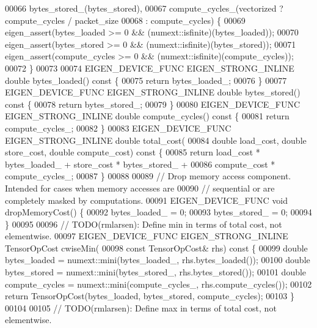 \begin{DoxyCode}
00066         bytes\_stored\_(bytes\_stored),
00067         compute\_cycles\_(vectorized ? compute\_cycles / packet\_size
00068                                    : compute\_cycles) \{
00069     eigen\_assert(bytes\_loaded >= 0 && (numext::isfinite)(bytes\_loaded));
00070     eigen\_assert(bytes\_stored >= 0 && (numext::isfinite)(bytes\_stored));
00071     eigen\_assert(compute\_cycles >= 0 && (numext::isfinite)(compute\_cycles));
00072   \}
00073 
00074   EIGEN\_DEVICE\_FUNC EIGEN\_STRONG\_INLINE \textcolor{keywordtype}{double} bytes\_loaded()\textcolor{keyword}{ const }\{
00075     \textcolor{keywordflow}{return} bytes\_loaded\_;
00076   \}
00077   EIGEN\_DEVICE\_FUNC EIGEN\_STRONG\_INLINE \textcolor{keywordtype}{double} bytes\_stored()\textcolor{keyword}{ const }\{
00078     \textcolor{keywordflow}{return} bytes\_stored\_;
00079   \}
00080   EIGEN\_DEVICE\_FUNC EIGEN\_STRONG\_INLINE \textcolor{keywordtype}{double} compute\_cycles()\textcolor{keyword}{ const }\{
00081     \textcolor{keywordflow}{return} compute\_cycles\_;
00082   \}
00083   EIGEN\_DEVICE\_FUNC EIGEN\_STRONG\_INLINE \textcolor{keywordtype}{double} total\_cost(
00084       \textcolor{keywordtype}{double} load\_cost, \textcolor{keywordtype}{double} store\_cost, \textcolor{keywordtype}{double} compute\_cost)\textcolor{keyword}{ const }\{
00085     \textcolor{keywordflow}{return} load\_cost * bytes\_loaded\_ + store\_cost * bytes\_stored\_ +
00086            compute\_cost * compute\_cycles\_;
00087   \}
00088 
00089   \textcolor{comment}{// Drop memory access component. Intended for cases when memory accesses are}
00090   \textcolor{comment}{// sequential or are completely masked by computations.}
00091   EIGEN\_DEVICE\_FUNC \textcolor{keywordtype}{void} dropMemoryCost() \{
00092     bytes\_loaded\_ = 0;
00093     bytes\_stored\_ = 0;
00094   \}
00095 
00096   \textcolor{comment}{// TODO(rmlarsen): Define min in terms of total cost, not elementwise.}
00097   EIGEN\_DEVICE\_FUNC EIGEN\_STRONG\_INLINE TensorOpCost cwiseMin(
00098       \textcolor{keyword}{const} TensorOpCost& rhs)\textcolor{keyword}{ const }\{
00099     \textcolor{keywordtype}{double} bytes\_loaded = numext::mini(bytes\_loaded\_, rhs.bytes\_loaded());
00100     \textcolor{keywordtype}{double} bytes\_stored = numext::mini(bytes\_stored\_, rhs.bytes\_stored());
00101     \textcolor{keywordtype}{double} compute\_cycles = numext::mini(compute\_cycles\_, rhs.compute\_cycles());
00102     \textcolor{keywordflow}{return} TensorOpCost(bytes\_loaded, bytes\_stored, compute\_cycles);
00103   \}
00104 
00105   \textcolor{comment}{// TODO(rmlarsen): Define max in terms of total cost, not elementwise.}

\end{DoxyCode}
